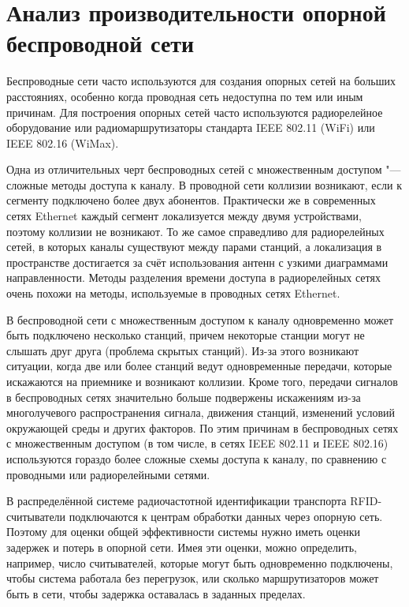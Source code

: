 \chapter{Анализ производительности опорной беспроводной сети}\label{ch:ch4}
Беспроводные сети часто используются для создания опорных сетей на больших расстояниях, особенно когда проводная сеть недоступна по тем или иным причинам. Для построения опорных сетей часто используются радиорелейное оборудование или радиомаршрутизаторы стандарта IEEE 802.11 (WiFi) или IEEE 802.16 (WiMax).

Одна из отличительных черт беспроводных сетей с множественным доступом "--- сложные методы доступа к каналу. В проводной сети коллизии возникают, если к сегменту подключено более двух абонентов. Практически же в современных сетях Ethernet каждый сегмент локализуется между двумя устройствами, поэтому коллизии не возникают. То же самое справедливо для радиорелейных сетей, в которых каналы существуют между парами станций, а локализация в пространстве достигается за счёт использования антенн с узкими диаграммами направленности. Методы разделения времени доступа в радиорелейных сетях очень похожи на методы, используемые в проводных сетях Ethernet.

В беспроводной сети с множественным доступом к каналу одновременно может быть подключено несколько станций, причем некоторые станции могут не слышать друг друга (проблема скрытых станций). Из-за этого возникают ситуации, когда две или более станций ведут одновременные передачи, которые искажаются на приемнике и возникают коллизии. Кроме того, передачи сигналов в беспроводных сетях значительно больше подвержены искажениям из-за многолучевого распространения сигнала, движения станций, изменений условий окружающей среды и других факторов. По этим причинам в беспроводных сетях с множественным доступом (в том числе, в сетях IEEE 802.11 и IEEE 802.16) используются гораздо более сложные схемы доступа к каналу, по сравнению с проводными или радиорелейными сетями.

В распределённой системе радиочастотной идентификации транспорта RFID-считыватели подключаются к центрам обработки данных через опорную сеть. Поэтому для оценки общей эффективности системы нужно иметь оценки задержек и потерь в опорной сети. Имея эти оценки, можно определить, например, число считывателей, которые могут быть одновременно подключены, чтобы система работала без перегрузок, или сколько маршрутизаторов может быть в сети, чтобы задержка оставалась в заданных пределах.

